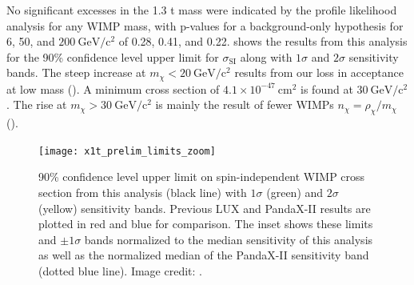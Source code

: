 No significant excesses in the 1.3 t mass were indicated by the profile likelihood analysis for any WIMP mass, with p-values for
a background-only hypothesis for 6, 50, and $200\ \mathrm{GeV/c^2}$ of 0.28, 0.41, and
0.22.   shows the results from this analysis for the 90\% confidence level upper limit
for $\sigma_{\mathrm{SI}}$ along with $1\sigma$ and $2\sigma$ sensitivity bands.  The steep increase at $m_{\chi} < 20\ \mathrm{GeV/c^2}$
results from our loss in acceptance at low mass ().  A minimum cross section of
$4.1 \times 10^{-47}\ \mathrm{cm^2}$ is found at $30\ \mathrm{GeV/c^2}$.  The rise at
$m_{\chi} > 30\ \mathrm{GeV/c^2}$ is mainly the result of fewer WIMPs $n_{\chi} = \rho_{\chi} / m_{\chi}$ ().

\begin{figure}
\centering
\texttt{[image: x1t\_prelim\_limits\_zoom]}
\caption[90\% confidence level upper limit on spin-independent WIMP cross section from this analysis with $1\sigma$
and $2\sigma$ sensitivity bands.]{90\% confidence level upper limit on spin-independent WIMP cross section from this analysis (black line)
with $1\sigma$ (green)
and $2\sigma$ (yellow) sensitivity bands.  Previous LUX  and PandaX-II  results are plotted in
red and blue for comparison.  The inset shows these limits and $\pm 1\sigma$ bands normalized to the median sensitivity of this
analysis as well as the normalized median of the PandaX-II sensitivity band (dotted blue line).  Image credit: .}
\label{fig:dark_matter_results_background_limit}
\end{figure}